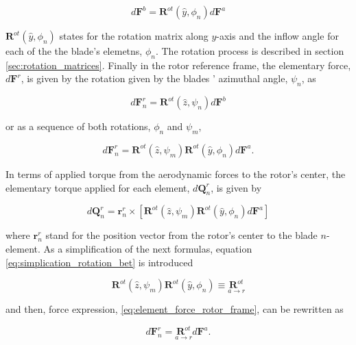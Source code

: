 \begin{equation}
    d\mathbf{F}^b = \boldsymbol{R}^{ot}(\hat{y}, \phi_n) d\mathbf{F}^a
    \label{eq:aero_to_blade_force}
\end{equation}

$\boldsymbol{R}^{ot}(\hat{y}, \phi_n)$ states for the rotation matrix along $y$-axis and the inflow angle for each of the the blade's elemetns, $\phi_n$. The rotation process is described in section \ref{sec:rotation_matrices}. Finally in the rotor reference frame, the elementary force, $d\mathbf{F}^r$, is given by the rotation given by the blades ' azimuthal angle, $\psi_n$, as

\begin{equation}
    d\mathbf{F}^r_n = \boldsymbol{R}^{ot}(\hat{z}, \psi_n) d\mathbf{F}^b
\end{equation}

\noindent or as a sequence of both rotations, $\phi_n$ and $\psi_m$,

\begin{equation}
    d\mathbf{F}^r_n = \boldsymbol{R}^{ot}(\hat{z}, \psi_m) \boldsymbol{R}^{ot}(\hat{y}, \phi_n) d\mathbf{F}^a.
    \label{eq:element_force_rotor_frame}
\end{equation}

In terms of applied torque from the aerodynamic forces to the rotor's center, the elementary torque applied for each element, $d\mathbf{Q}^r_n$, is given by 

\begin{equation}
    d\mathbf{Q}^r_n = \mathbf{r}^r_n \times \left[ \boldsymbol{R}^{ot}(\hat{z}, \psi_m) \boldsymbol{R}^{ot}(\hat{y}, \phi_n) d\mathbf{F}^a \right] 
    \label{eq:element_torque_rotor_frame}
\end{equation}

\noindent where $\mathbf{r}^r_n$ stand for the position vector from the rotor's center to the blade $n$-element. As a simplification of the next formulas, equation  \ref{eq:simplication_rotation_bet} is introduced

\begin{equation}
    \boldsymbol{R}^{ot}(\hat{z}, \psi_m) \boldsymbol{R}^{ot}(\hat{y}, \phi_n) \equiv \underset{a \to r}{\boldsymbol{R}^{ot}}
    \label{eq:simplication_rotation_bet}
\end{equation}

\noindent and then, force expression, \ref{eq:element_force_rotor_frame}, can be rewritten as

\begin{equation}
    d\mathbf{F}^r_n = \underset{a \to r}{\boldsymbol{R}^{ot}} d\mathbf{F}^a.
    \label{eq:element_force_rotor_frame_simplified}
\end{equation}

